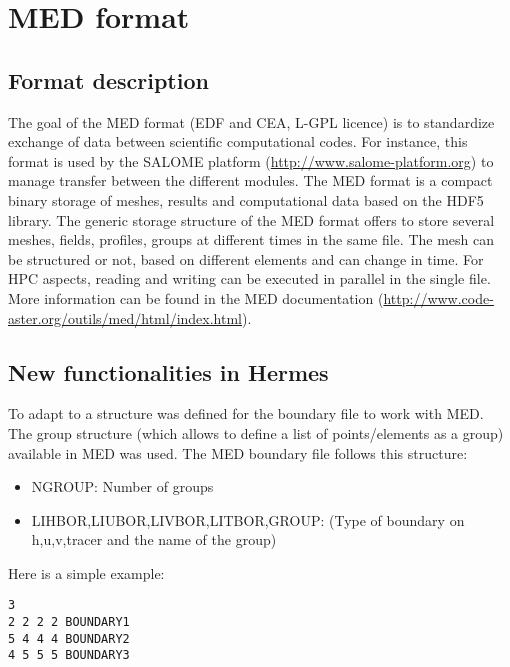 \section{MED format}
%
\subsection{Format description}
%
The goal of the MED format (EDF and CEA, L-GPL licence) is to standardize
exchange of data between scientific computational codes. For instance, this
format is used by the SALOME platform (\url{http://www.salome-platform.org})
to manage transfer between the different modules. The MED format is a compact
binary storage of meshes, results and computational data based on the HDF5
library. The generic storage structure of the MED format offers to store
several meshes, fields, profiles, groups at different times in the same file.
The mesh can be structured or not, based on different elements and can change
in time. For HPC aspects, reading and writing can be executed in parallel in
the single file. More information can be found in the MED documentation
(\url{http://www.code-aster.org/outils/med/html/index.html}).
%
\subsection{New functionalities in Hermes}
%
To adapt to \telemacsystem a structure was defined for the boundary file to work with
MED. The group structure (which allows to define a list of points/elements as a
group) available in MED was used. The MED boundary file follows this structure:
\begin{itemize}
\item NGROUP: Number of groups
\item LIHBOR,LIUBOR,LIVBOR,LITBOR,GROUP: (Type of boundary on h,u,v,tracer and
the name of the group)
\end{itemize}
%
Here is a simple example:
\begin{verbatim}
3
2 2 2 2 BOUNDARY1
5 4 4 4 BOUNDARY2
4 5 5 5 BOUNDARY3
\end{verbatim}

% 
